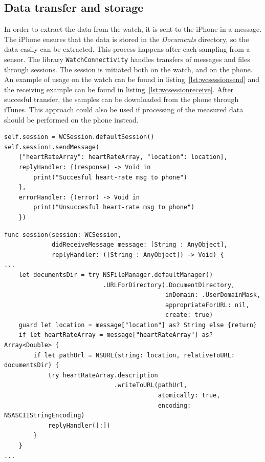 \subsection{Data transfer and storage}
In order to extract the data from the watch, it is sent to the iPhone in a
message. The iPhone ensures that the data is stored in the \textit{Documents}
directory, so the data easily can be extracted. This process happens after each
sampling from a sensor. The library \texttt{WatchConnectivity} handles transfers
of messages and files through sessions. The session is initiated both on the
watch, and on the phone. An example of usage on the watch can be found in 
listing~\ref{lst:wcsessionsend} and the receiving example can be found in 
listing~\ref{lst:wcsessionreceive}.
After succesful transfer, the samples can be downloaded from the phone through
iTunes.
This approach could also be used if processing of the measured data should be
performed on the phone instead.

\begin{lstlisting}[label={lst:wcsessionsend},caption={Send heart rate data to the
phone from the watch.},basicstyle=\small]
self.session = WCSession.defaultSession()
self.session!.sendMessage(
    ["heartRateArray": heartRateArray, "location": location],
    replyHandler: {(response) -> Void in
        print("Succesful heart-rate msg to phone")
    },
    errorHandler: {(error) -> Void in
        print("Unsuccesful heart-rate msg to phone")
    })
\end{lstlisting}

\begin{lstlisting}[label={lst:wcsessionreceive},caption={Receiving heart rate
data on phone, and storing it to the Documents folder.},basicstyle=\small]
func session(session: WCSession, 
             didReceiveMessage message: [String : AnyObject], 
             replyHandler: ([String : AnyObject]) -> Void) {
...
    let documentsDir = try NSFileManager.defaultManager()
                           .URLForDirectory(.DocumentDirectory, 
                                            inDomain: .UserDomainMask,
                                            appropriateForURL: nil, 
                                            create: true)
    guard let location = message["location"] as? String else {return}
    if let heartRateArray = message["heartRateArray"] as? Array<Double> {
        if let pathUrl = NSURL(string: location, relativeToURL: documentsDir) {
            try heartRateArray.description
                              .writeToURL(pathUrl, 
                                          atomically: true, 
                                          encoding: NSASCIIStringEncoding)
            replyHandler([:])
        }
    }
...
\end{lstlisting}
